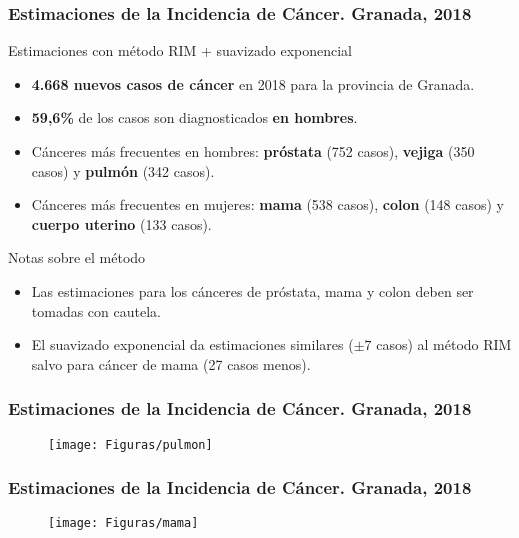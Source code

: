 \documentclass{beamer}
\begin{document}
\begin{frame}\frametitle{Estimaciones de la Incidencia de Cáncer. Granada, 2018}
	\begin{block}{Estimaciones con método RIM + suavizado exponencial}
		\begin{itemize}
			\item \textbf{4.668 nuevos casos de cáncer }en 2018 para la provincia de Granada.
			\item\textbf{ 59,6\%} de los casos son diagnosticados \textbf{en hombres}.
			\item Cánceres más frecuentes en hombres: \textbf{próstata} (752 casos), \textbf{vejiga} (350 casos) y \textbf{pulmón} (342 casos).
			\item Cánceres más frecuentes en mujeres: \textbf{mama} (538 casos), \textbf{colon} (148 casos) y \textbf{cuerpo uterino} (133 casos).
		\end{itemize}
	\end{block} \pause
	\begin{block}{Notas sobre el método}
		\begin{itemize}
			\item Las estimaciones para los cánceres de próstata, mama y colon deben ser tomadas con cautela.
			\item El suavizado exponencial da estimaciones similares ($\pm 7$ casos) al método RIM salvo para cáncer de mama (27 casos menos).
		\end{itemize}
	\end{block}
\end{frame}


\begin{frame}\frametitle{Estimaciones de la Incidencia de Cáncer. Granada, 2018}
\vspace{-10pt}
		\begin{figure}
			\centering
			\texttt{[image: Figuras/pulmon]}
		\end{figure}


\end{frame}

\begin{frame}\frametitle{Estimaciones de la Incidencia de Cáncer. Granada, 2018}
\vspace{-10pt}

		\begin{figure}
			\centering
			\texttt{[image: Figuras/mama]}
		\end{figure}

\end{frame}
\end{document}
